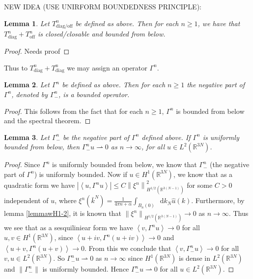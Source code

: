 \documentclass[a4paper,11pt]{article}
\newcommand{\norm}[1]{\left\lVert #1 \right\rVert}
\newcommand{\abs}[1]{\left\lvert #1 \right\rvert}
\renewcommand{\braket}[1]{\left\langle#1\right\rangle}
\newcommand*\diff{\mathop{}\!\mathrm{d}}
\newcommand{\R}{\mathbb{R}}
\newtheorem{lemma}{Lemma}
\numberwithin{equation}{section}
\begin{document}
	NEW IDEA (USE UNIRFORM BOUNDEDNESS PRINCIPLE):\\
	\begin{lemma}
		Let $ T^n_{\text{diag/off}} $ be defined as above. Then for each $ n\geq1 $, we have that $  T^n_{\text{diag}}+T^n_{\text{off}}  $ is closed/closable and bounded from below.
	\end{lemma}
	\begin{proof}
		Needs proof
	\end{proof}
	Thus to $ T^n_{\text{diag}}+T^n_{\text{diag}} $ we may assign an operator $ \Gamma^n $.
	\begin{lemma}\label{lemmaGammaNegativePartBounded}
		Let $ \Gamma^n $ be defined as above. Then for each $ n\geq1 $ the negative part of $ \Gamma^n $, denoted by $ \Gamma^n_- $, is a bounded operator.
	\end{lemma}
	\begin{proof}
		This follows from the fact that for each $ n\geq1 $, $ \Gamma^n $ is bounded from below and the spectral theorem.
	\end{proof}
	\begin{lemma}\label{lemmaGammaBoundednessWeakConvergence1}
			Let $ \Gamma^n_- $ be the negative part of $ \Gamma^n $ defined above. If $ \Gamma^n $ is uniformly bounded from below, then $ \Gamma^n_- u\rightharpoonup0 $ as $ n\to\infty $, for all $ u\in L^2(\R^{3N}) $.
	\end{lemma}
	\begin{proof}
		Since $ \Gamma^n $ is uniformly bounded from below, we know that $ \Gamma^n_- $ (the negative part of $ \Gamma^n $) is uniformly bounded. Now if $ u\in H^1(\R^{3N}) $, we know that as a quadratic form we have $ \abs{\braket{u,\Gamma^nu}}\leq C \norm{\xi^n}^2_{H^{1/2}(\R^{3(N-1)})} $ for some $ C>0 $ independent of $ u $, where $ \xi^n(\bar{k}^N)=\frac{1}{4\pi n+\alpha}\int_{B_n(0)}\diff k_N \hat{u}(k) $. Furthermore, by lemma \ref{lemmawH1-2}, it is known that $ \norm{\xi^n}_{H^{1/2}(\R^{3(N-1)})}\to0 $ as $ n\to\infty $. Thus we see that as a sesquiliniear form we have $ \braket{v,\Gamma^n u}\to0 $ for all $ u,v\in H^1(\R^{3N}) $, since $ \braket{u+iv,\Gamma^n (u+iv)}\to0 $ and $ \braket{u+v,\Gamma^n (u+v)}\to0 $. From this we conclude that $ \braket{v,\Gamma^n_-u}\to 0 $ for all $ v,u\in L^2(\R^{3N}) $. So $ \Gamma^n_-u\rightharpoonup0 $ as $ n\to\infty $ since $ H^1(\R^{3N}) $ is dense in $ L^2(\R^{3N}) $ and $ \norm{\Gamma^n_-} $ is uniformly bounded. Hence $ \Gamma^n_-u\rightharpoonup0 $ for all $ u\in L^2(\R^{3N}) $.
	\end{proof}
\end{document}
